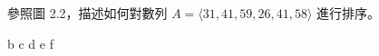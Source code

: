 \startEXERCISE
參照圖 2.2，描述如何對數列 $A = \langle 31, 41, 59, 26, 41, 58\rangle$ 進行排序。
\stopEXERCISE

\startANSWER
{}
{\externalfigure[e2_1_1-2]}{b}
{\externalfigure[e2_1_1-3]}{c}
{\externalfigure[e2_1_1-4]}{d}
{\externalfigure[e2_1_1-5]}{e}
{\externalfigure[e2_1_1-6]}{f}
\stopcombination
\stopANSWER
